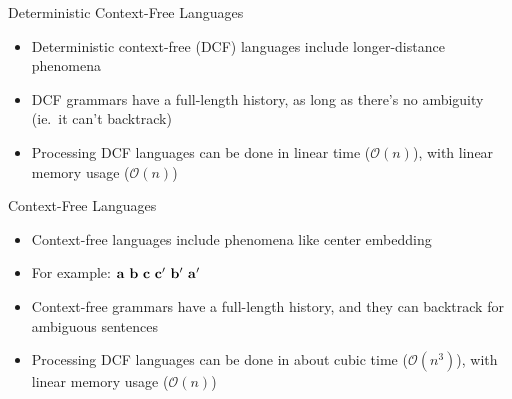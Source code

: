 \documentclass{beamer}
\newcommand{\detail}[1]{{\color{lightgrey}\small{}#1}}
\begin{document}
\begin{frame}{Deterministic Context-Free Languages}
\begin{block}{}
\begin{itemize}
	\item Deterministic context-free (DCF) languages include longer-distance phenomena
	\item DCF grammars have a full-length history, as long as there's no ambiguity (ie.\ it can't backtrack)
	\pause
	\item Processing DCF languages can be done in linear time \detail{($\mathcal{O}(n)$)}, with linear memory usage \detail{($\mathcal{O}(n)$)}
\end{itemize}
\end{block}
\end{frame}


\begin{frame}{Context-Free Languages}
\begin{block}{}
\begin{itemize}
	\item Context-free languages include phenomena like center embedding
	\item For example: $\bf a \ b \ c \ c^{\prime} \ b^{\prime} \ a^{\prime}$
	\pause
	\item Context-free grammars have a full-length history, and they can backtrack for ambiguous sentences
	\pause
	\item Processing DCF languages can be done in about cubic time \detail{($\mathcal{O}(n^3)$)}, with linear memory usage \detail{($\mathcal{O}(n)$)}
\end{itemize}
\end{block}
\end{frame}
\end{document}
